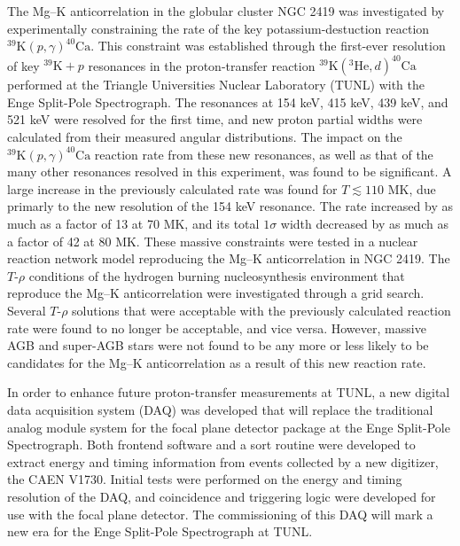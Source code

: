 The Mg--K anticorrelation in the globular cluster NGC 2419 was investigated by experimentally constraining the rate of the key potassium-destuction reaction $^{39}\mathrm{K}(p,\gamma)^{40}\mathrm{Ca}$. This constraint was established through the first-ever resolution of key $^{39}\mathrm{K}+p$ resonances in the proton-transfer reaction $^{39}\mathrm{K}(^{3}\mathrm{He},d)^{40}\mathrm{Ca}$ performed at the Triangle Universities Nuclear Laboratory (TUNL) with the Enge Split-Pole Spectrograph. The resonances at 154 keV, 415 keV, 439 keV, and 521 keV were resolved for the first time, and new proton partial widths were calculated from their measured angular distributions. The impact on the $^{39}\mathrm{K}(p,\gamma)^{40}\mathrm{Ca}$ reaction rate from these new resonances, as well as that of the many other resonances resolved in this experiment, was found to be significant. A large increase in the previously calculated rate was found for $T \lesssim 110$ MK, due primarly to the new resolution of the 154 keV resonance. The rate increased by as much as a factor of 13 at 70 MK, and its total $1\sigma$ width decreased by as much as a factor of 42 at 80 MK. These massive constraints were tested in a nuclear reaction network model reproducing the Mg--K anticorrelation in NGC 2419. The $T$-$\rho$ conditions of the hydrogen burning nucleosynthesis environment that reproduce the Mg--K anticorrelation were investigated through a grid search. Several $T$-$\rho$ solutions that were acceptable with the previously calculated reaction rate were found to no longer be acceptable, and vice versa. However, massive AGB and super-AGB stars were not found to be any more or less likely to be candidates for the Mg--K anticorrelation as a result of this new reaction rate.

In order to enhance future proton-transfer measurements at TUNL, a new digital data acquisition system (DAQ) was developed that will replace the traditional analog module system for the focal plane detector package at the Enge Split-Pole Spectrograph. Both frontend software and a sort routine were developed to extract energy and timing information from events collected by a new digitizer, the CAEN V1730. Initial tests were performed on the energy and timing resolution of the DAQ, and coincidence and triggering logic were developed for use with the focal plane detector. The commissioning of this DAQ will mark a new era for the Enge Split-Pole Spectrograph at TUNL.